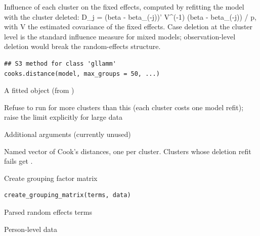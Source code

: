 \documentclass[a4paper]{book}
\begin{document}
%
\begin{Description}
Influence of each cluster on the fixed effects, computed by refitting the
model with the cluster deleted: D\_j = (beta - beta\_(-j))' V\textasciicircum{}(-1)
(beta - beta\_(-j)) / p, with V the estimated covariance of the fixed
effects. Case deletion at the cluster level is the standard influence
measure for mixed models; observation-level deletion would break the
random-effects structure.
\end{Description}
%
\begin{Usage}
\begin{verbatim}
## S3 method for class 'gllamm'
cooks.distance(model, max_groups = 50, ...)
\end{verbatim}
\end{Usage}
%
\begin{Arguments}
\begin{ldescription}
\item[\code{model}] A fitted  object (from )

\item[\code{max\_groups}] Refuse to run for more clusters than this (each cluster
costs one model refit); raise the limit explicitly for large data

\item[\code{...}] Additional arguments (currently unused)
\end{ldescription}
\end{Arguments}
%
\begin{Value}
Named vector of Cook's distances, one per cluster. Clusters whose
deletion refit fails get .
\end{Value}
%
\begin{Description}
Create grouping factor matrix
\end{Description}
%
\begin{Usage}
\begin{verbatim}
create_grouping_matrix(terms, data)
\end{verbatim}
\end{Usage}
%
\begin{Arguments}
\begin{ldescription}
\item[\code{terms}] Parsed random effects terms

\item[\code{data}] Person-level data
\end{ldescription}
\end{Arguments}
\end{document}
